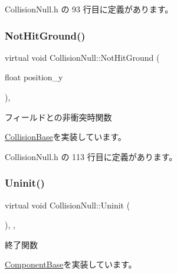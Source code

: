  Collision\+Null.\+h の 93 行目に定義があります。

\mbox{\label{class_collision_null_ad456a03a3e3d55d8d408b7ed28ce7911}} 
\subsubsection{\texorpdfstring{Not\+Hit\+Ground()}{NotHitGround()}}
{\footnotesize\ttfamily virtual void Collision\+Null\+::\+Not\+Hit\+Ground (\begin{DoxyParamCaption}\item[{float}]{position\+\_\+y }\end{DoxyParamCaption})\hspace{0.3cm}{\ttfamily [inline]}, {\ttfamily [virtual]}}



フィールドとの非衝突時関数 



\mbox{\hyperlink{class_collision_base_ac1ed5b1c0c9b6b70b432e6656f9c4b45}{Collision\+Base}}を実装しています。



 Collision\+Null.\+h の 113 行目に定義があります。

\mbox{\label{class_collision_null_a7c6d0ec502efc55e2f406415451152f5}} 
\subsubsection{\texorpdfstring{Uninit()}{Uninit()}}
{\footnotesize\ttfamily virtual void Collision\+Null\+::\+Uninit (\begin{DoxyParamCaption}{ }\end{DoxyParamCaption})\hspace{0.3cm}{\ttfamily [inline]}, {\ttfamily [override]}, {\ttfamily [virtual]}}



終了関数 



\mbox{\hyperlink{class_component_base_a9f42beaf0383d6f629819579cab4de57}{Component\+Base}}を実装しています。




